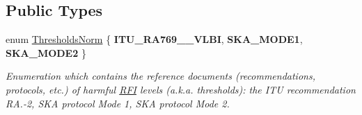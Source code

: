\subsection*{Public Types}
\begin{DoxyCompactItemize}
\item 
\mbox{\label{structRFI_a18cfa7d24274bbcd14acc6b513860cb0}} 
enum \hyperlink{structRFI_a18cfa7d24274bbcd14acc6b513860cb0}{Thresholds\+Norm} \{ {\bfseries I\+T\+U\+\_\+\+R\+A769\+\_\+\_\+\+V\+L\+BI}, 
{\bfseries S\+K\+A\+\_\+\+M\+O\+D\+E1}, 
{\bfseries S\+K\+A\+\_\+\+M\+O\+D\+E2}
 \}\begin{DoxyCompactList}\small\item\em Enumeration which contains the reference documents (recommendations, protocols, etc.) of harmful \hyperlink{structRFI}{R\+FI} levels (a.\+k.\+a. thresholds)\+: the I\+TU recommendation R\+A.-\/2, S\+KA protocol Mode 1, S\+KA protocol Mode 2. \end{DoxyCompactList}
\end{DoxyCompactItemize}
